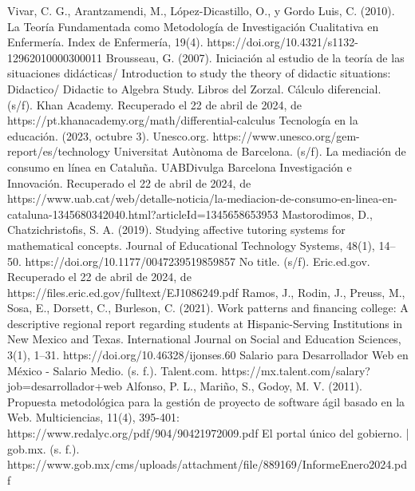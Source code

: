 \documentclass{article}
\begin{document}
\begin{thebibliography}{99}
   Vivar, C. G., Arantzamendi, M., López-Dicastillo, O., y Gordo Luis, C. (2010). La Teoría Fundamentada como Metodología de Investigación Cualitativa en Enfermería. Index de Enfermería, 19(4). https://doi.org/10.4321/s1132-12962010000300011
   Brousseau, G. (2007). Iniciación al estudio de la teoría de las situaciones didácticas/ Introduction to study the theory of didactic situations: Didactico/ Didactic to Algebra Study. Libros del Zorzal.
  Cálculo diferencial. (s/f). Khan Academy. Recuperado el 22 de abril de 2024, de https://pt.khanacademy.org/math/differential-calculus
   Tecnología en la educación. (2023, octubre 3). Unesco.org. https://www.unesco.org/gem-report/es/technology
   Universitat Autònoma de Barcelona. (s/f). La mediación de consumo en línea en Cataluña. UABDivulga Barcelona Investigación e Innovación. Recuperado el 22 de abril de 2024, de https://www.uab.cat/web/detalle-noticia/la-mediacion-de-consumo-en-linea-en-cataluna-1345680342040.html?articleId=1345658653953
   Mastorodimos, D., Chatzichristofis, S. A. (2019). Studying affective tutoring systems for mathematical concepts. Journal of Educational Technology Systems, 48(1), 14–50. https://doi.org/10.1177/0047239519859857
   No title. (s/f). Eric.ed.gov. Recuperado el 22 de abril de 2024, de https://files.eric.ed.gov/fulltext/EJ1086249.pdf
   Ramos, J., Rodin, J., Preuss, M., Sosa, E., Dorsett, C., Burleson, C. (2021). Work patterns and financing college: A descriptive regional report regarding students at Hispanic-Serving Institutions in New Mexico and Texas. International Journal on Social and Education Sciences, 3(1), 1–31. https://doi.org/10.46328/ijonses.60
  Salario para Desarrollador Web en México - Salario Medio. (s. f.). Talent.com. https://mx.talent.com/salary?job=desarrollador+web
  Alfonso, P. L., Mariño, S., Godoy, M. V. (2011). Propuesta metodológica para la gestión de proyecto de software ágil basado en la Web. Multiciencias, 11(4), 395-401: https://www.redalyc.org/pdf/904/90421972009.pdf
  El portal único del gobierno. | gob.mx. (s. f.). https://www.gob.mx/cms/uploads/attachment/file/889169/InformeEnero2024.pdf

\end{thebibliography}
\end{document}
